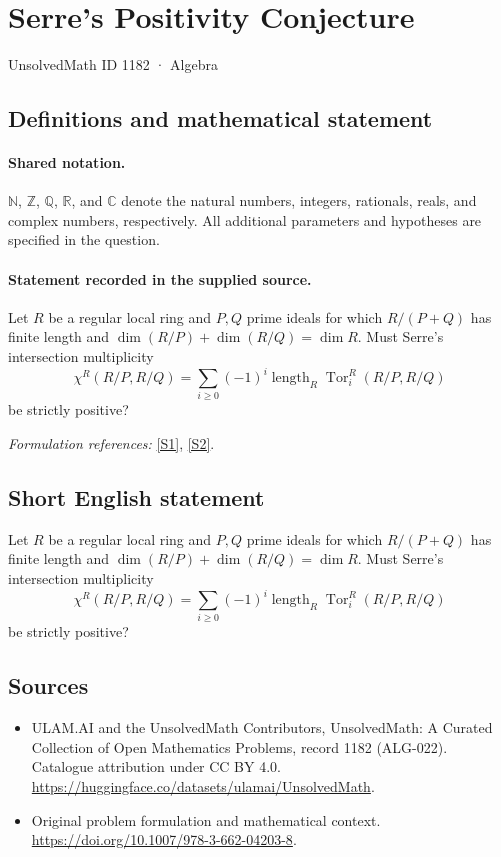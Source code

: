 \documentclass[11pt]{article}
\newcommand{\sref}[2]{\hyperlink{source:#1:#2}{[S#2]}}
\begin{document}
\setcounter{section}{1181}
\section{Serre's Positivity Conjecture}\label{1182}
{\small UnsolvedMath ID 1182 · Algebra}
\subsection{Definitions and mathematical statement}

\paragraph{Shared notation.}$\mathbb N$, $\mathbb Z$, $\mathbb Q$, $\mathbb R$, and $\mathbb C$ denote the natural numbers, integers, rationals, reals, and complex numbers, respectively. All additional parameters and hypotheses are specified in the question.


\paragraph{Statement recorded in the supplied source.}
Let $R$ be a regular local ring and $P,Q$ prime ideals for which $R/(P+Q)$ has finite length and $\dim(R/P)+\dim(R/Q)=\dim R$. Must Serre's intersection multiplicity
\[\chi^R(R/P,R/Q)=\sum_{i\geq0}(-1)^i\operatorname{length}_R\operatorname{Tor}_i^R(R/P,R/Q)\]
be strictly positive?
\par\smallskip\textit{Formulation references:} \sref{1182}{1}, \sref{1182}{2}.
\subsection{Short English statement}
Let $R$ be a regular local ring and $P,Q$ prime ideals for which $R/(P+Q)$ has finite length and $\dim(R/P)+\dim(R/Q)=\dim R$. Must Serre's intersection multiplicity
\[\chi^R(R/P,R/Q)=\sum_{i\geq0}(-1)^i\operatorname{length}_R\operatorname{Tor}_i^R(R/P,R/Q)\]
be strictly positive?
\subsection{Sources}
\begin{itemize}
\item[\hypertarget{source:1182:1}{S1}] ULAM.AI and the UnsolvedMath Contributors, UnsolvedMath: A Curated Collection of Open Mathematics Problems, record 1182 (ALG-022). Catalogue attribution under CC BY 4.0.
\url{https://huggingface.co/datasets/ulamai/UnsolvedMath}.
\item[\hypertarget{source:1182:2}{S2}] Original problem formulation and mathematical context.
\url{https://doi.org/10.1007/978-3-662-04203-8}.
\end{itemize}
\label{end:1182}
\end{document}
